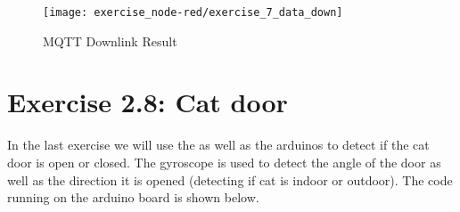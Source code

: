 \begin{figure}[H]
  \centering
  \texttt{[image: exercise\_node-red/exercise\_7\_data\_down]}
  \caption{MQTT Downlink Result}
  \label{fig:exercise_7_data_down}
\end{figure}


\section{Exercise 2.8: Cat door}

In the last exercise we will use the  as well as the arduinos  to 
detect if the cat door is open or closed. The gyroscope is used to detect the angle of the door 
as well as the direction it is opened (detecting if cat is indoor or outdoor).
\newline
\newline
The code running on the arduino board is shown below.


